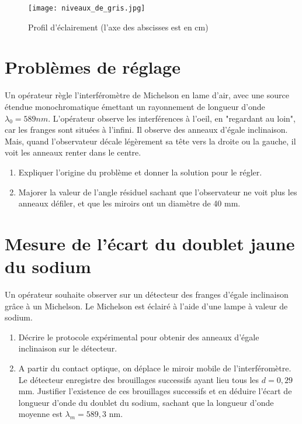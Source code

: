 \documentclass{article}
\begin{document}
\begin{figure}
  \centering
  \texttt{[image: niveaux\_de\_gris.jpg]}
  \caption{Profil d'éclairement (l'axe des abscisses est en cm)}   
  \label{fig:niveaux_de_gris}
\end{figure}

\section{Problèmes de réglage}
Un opérateur règle l'interféromètre de Michelson en lame d'air, avec une source étendue monochromatique émettant un rayonnement de longueur d'onde $\lambda_0 = 589 nm$. 
L'opérateur observe les interférences à l'oeil, en "regardant au loin", car les franges sont situées à l'infini.
Il observe des anneaux d'égale inclinaison. 
Mais, quand l'observateur décale légèrement sa tête vers la droite ou la gauche, il voit les anneaux renter dans le centre. 
\begin{enumerate}
  \item Expliquer l'origine du problème et donner la solution pour le régler. 
  \item Majorer la valeur de l'angle résiduel sachant que l'observateur ne voit plus les anneaux défiler, et que les miroirs ont un diamètre de 40 mm. 
\end{enumerate}


\section{Mesure de l'écart du doublet jaune du sodium}


Un opérateur souhaite observer sur un détecteur des franges d'égale inclinaison grâce à un Michelson. 
Le Michelson est éclairé à l'aide d'une lampe à valeur de sodium. 
\begin{enumerate}
  \item Décrire le protocole expérimental pour obtenir des anneaux d'égale inclinaison sur le détecteur. 
  \item A partir du contact optique, on déplace le miroir mobile de l'interféromètre. Le détecteur enregistre des brouillages successifs ayant lieu tous les $d=0,29$mm. Justifier l'existence de ces brouillages successifs et en déduire l'écart de longueur d'onde du doublet du sodium, sachant que la longueur d'onde moyenne est $\lambda_m = 589,3$ nm. 
\end{enumerate}
\end{document}
